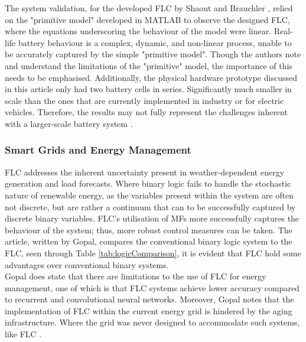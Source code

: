 \documentclass[12pt]{article}
\begin{document}
The system validation, for the developed FLC by Shaout and Brauchler \cite{BMS}, relied on the "primitive model" developed in MATLAB to observe the designed FLC, where the equations underscoring the behaviour of the model were linear.
Real-life battery behaviour is a complex, dynamic, and non-linear process, unable to be accurately captured by the simple "primitive model".
Though the authors note and understand the limitations of the "primitive" model, the importance of this needs to be emphasised.
Additionally, the physical hardware prototype discussed in this article only had two battery cells in series.
Significantly much smaller in scale than the ones that are currently implemented in industry or for electric vehicles.
Therefore, the results may not fully represent the challenges inherent with a larger-scale battery system \cite{BMS}.

\subsubsection{Smart Grids and Energy Management}

FLC addresses the inherent uncertainty present in weather-dependent energy generation and load forecasts.
Where binary logic fails to handle the stochastic nature of renewable energy, as the variables present within the system are often not discrete, but are rather a continuum that can to be successfully captured by discrete binary variables.
FLC's utilisation of MFs more successfully captures the behaviour of the system; thus, more robust control measures can be taken.
The article, written by Gopal, compares the conventional binary logic system to the FLC, seen through Table \ref{tab:logicComparison}, it is evident that FLC hold some advantages over conventional binary systems.
\\

Gopal does state that there are limitations to the use of FLC for energy management, one of which is that FLC systems achieve lower accuracy compared to recurrent and convolutional neural networks.
Moreover, Gopal notes that the implementation of FLC within the current energy grid is hindered by the aging infrastructure.
Where the grid was never designed to accommodate such systems, like FLC \cite{kolli2025}.
\end{document}
